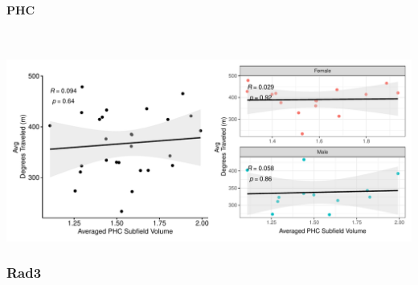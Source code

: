 \documentclass[
]{article}
\begin{document}
\paragraph{PHC}

~ \vspace{1cm}

\includegraphics{hippocampal_subfield_files/figure-latex/unnamed-chunk-19-1.pdf}

\subsubsection{Rad3}
\end{document}

